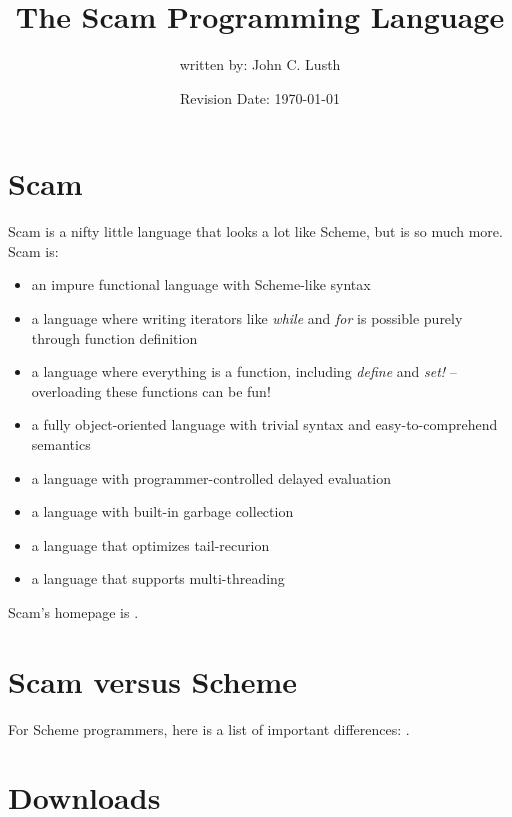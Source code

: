 \documentclass{article}
\title{The Scam Programming Language}
\author{written by: John C. Lusth}
\date{Revision Date: \today}
\begin{document}
\maketitle


\W\subsubsection{}

\W\htmlrule

\section{Scam}

Scam is a nifty little language
that looks a lot like Scheme, but is so much more.
Scam is:

\begin{itemize}
    \item
        an impure functional language with Scheme-like syntax
    \item
        a language where writing iterators like {\it while} and {\it for}
        is possible purely through function definition
    \item
        a language where everything is a function,
        including {\it define} and {\it set!}
        -- overloading these functions can be fun!
    \item
        a fully object-oriented language with trivial syntax and
        easy-to-comprehend semantics
    \item
        a language with programmer-controlled delayed
        evaluation
    \item
        a language with built-in garbage collection
    \item
        a language that optimizes tail-recurion
    \item
        a language that supports multi-threading
\end{itemize}

Scam's homepage is 
.

\section*{Scam versus Scheme}

For Scheme programmers, here is a list of important
differences: .

\section*{Downloads}
\end{document}
